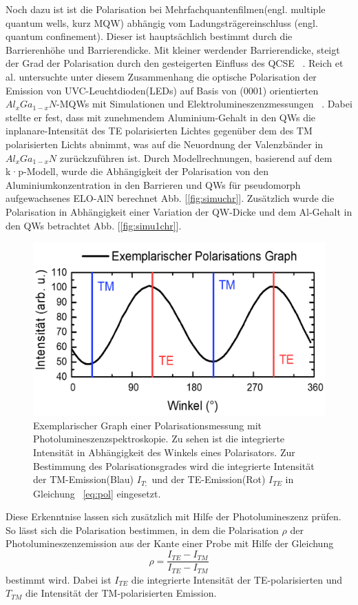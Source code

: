 Noch dazu ist ist die Polarisation bei Mehrfachquantenfilmen(engl. multiple quantum wells, kurz MQW) abhängig vom Ladungsträgereinschluss (engl. quantum confinement). Dieser ist hauptsächlich bestimmt durch die Barrierenhöhe und Barrierendicke. Mit kleiner werdender Barrierendicke, steigt der Grad der Polarisation durch den gesteigerten Einfluss des QCSE ~\cite{PhysRevB.84.035305}. 
Reich et al. untersuchte unter diesem Zusammenhang die optische Polarisation der Emission von UVC-Leuchtdioden(LEDs) auf Basis von (0001) orientierten $Al_{x}Ga_{1-x}N$-MQWs mit Simulationen und Elektrolumineszenzmessungen ~\cite{doi:10.1063/1.4932651}. Dabei stellte er fest, dass mit zunehmendem Aluminium-Gehalt in den QWs die inplanare-Intensität des TE polarisierten Lichtes gegenüber dem des TM polarisierten Lichts abnimmt, was auf die Neuordnung der Valenzbänder in $Al_{x}Ga_{1-x}N$ zurückzuführen ist. 
Durch Modellrechnungen, basierend auf dem k·p-Modell, wurde die Abhängigkeit der Polarisation von den Aluminiumkonzentration in den Barrieren und QWs für pseudomorph aufgewachsenes ELO-AlN berechnet Abb. [\ref{fig:simuchr}]. Zusätzlich wurde die Polarisation in Abhängigkeit einer Variation der QW-Dicke und dem Al-Gehalt in den QWs betrachtet Abb. [\ref{fig:simu1chr}].
\begin{figure}[htb]
  \centering
  \begin{minipage}{\linewidth}
      \centering
      \includegraphics[width=0.6\linewidth]{Bilder/exemplPolGraph.png}
      \caption{Exemplarischer Graph einer Polarisationsmessung mit Photolumineszenzspektroskopie. Zu sehen ist die integrierte Intensität in Abhängigkeit des Winkels eines Polarisators. Zur Bestimmung des Polarisationsgrades wird die integrierte Intensität der TM-Emission(Blau) $I_{T;}$  und der TE-Emission(Rot) $I_{TE}$ in Gleichung ~\ref{eq:pol} eingesetzt.}
      \label{fig:degra}
  \end{minipage}
\end{figure}
Diese Erkenntnise lassen sich zusätzlich mit Hilfe der Photolumineszenz prüfen. So lässt sich die Polarisation bestimmen, in dem die Polarisation $\rho$ der Photolumineszenzemission aus der Kante einer Probe mit Hilfe der Gleichung 
\begin{equation}
\rho = \frac{ I_{TE} - I_{TM} }{ I_{TE} - I_{TM} } 
\label{eq:pol}
\end{equation}
bestimmt wird. Dabei ist $I_{TE}$ die integrierte Intensität der TE-polarisierten und $T_{TM}$ die Intensität der TM-polarisierten Emission. 
 


